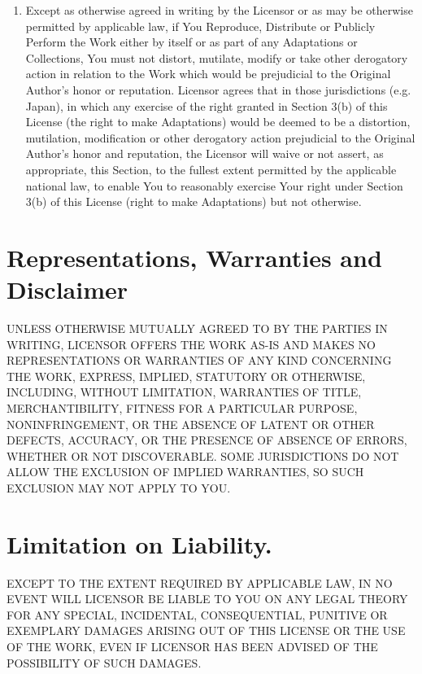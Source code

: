 \documentclass[10pt]{book}
\begin{document}
\begin{enumerate}
	\item Except as otherwise agreed in writing by the Licensor           or as may be otherwise permitted by applicable law, if           You Reproduce, Distribute or Publicly Perform the Work           either by itself or as part of any Adaptations or           Collections, You must not distort, mutilate, modify or           take other derogatory action in relation to the Work           which would be prejudicial to the Original Author's honor           or reputation. Licensor agrees that in those           jurisdictions (e.g. Japan), in which any exercise of the           right granted in Section 3(b) of this License (the right           to make Adaptations) would be deemed to be a distortion,           mutilation, modification or other derogatory action           prejudicial to the Original Author's honor and           reputation, the Licensor will waive or not assert, as           appropriate, this Section, to the fullest extent           permitted by the applicable national law, to enable You           to reasonably exercise Your right under Section 3(b) of           this License (right to make Adaptations) but not           otherwise.
\end{enumerate}

\section{ Representations, Warranties and         Disclaimer}

UNLESS OTHERWISE MUTUALLY AGREED TO BY THE PARTIES IN         WRITING, LICENSOR OFFERS THE WORK AS-IS AND MAKES NO         REPRESENTATIONS OR WARRANTIES OF ANY KIND CONCERNING THE         WORK, EXPRESS, IMPLIED, STATUTORY OR OTHERWISE, INCLUDING,         WITHOUT LIMITATION, WARRANTIES OF TITLE, MERCHANTIBILITY,         FITNESS FOR A PARTICULAR PURPOSE, NONINFRINGEMENT, OR THE         ABSENCE OF LATENT OR OTHER DEFECTS, ACCURACY, OR THE         PRESENCE OF ABSENCE OF ERRORS, WHETHER OR NOT DISCOVERABLE.         SOME JURISDICTIONS DO NOT ALLOW THE EXCLUSION OF IMPLIED         WARRANTIES, SO SUCH EXCLUSION MAY NOT APPLY TO YOU.

\section{ Limitation on Liability.} EXCEPT TO         THE EXTENT REQUIRED BY APPLICABLE LAW, IN NO EVENT WILL         LICENSOR BE LIABLE TO YOU ON ANY LEGAL THEORY FOR ANY         SPECIAL, INCIDENTAL, CONSEQUENTIAL, PUNITIVE OR EXEMPLARY         DAMAGES ARISING OUT OF THIS LICENSE OR THE USE OF THE WORK,         EVEN IF LICENSOR HAS BEEN ADVISED OF THE POSSIBILITY OF         SUCH DAMAGES.
\end{document}
